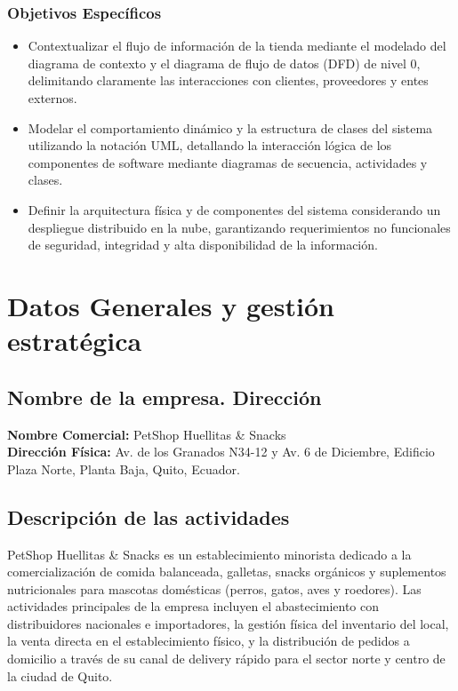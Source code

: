 \documentclass[11pt,a4paper]{article}
\begin{document}
\subsubsection{Objetivos Específicos}
\begin{itemize}
    \item Contextualizar el flujo de información de la tienda mediante el modelado del diagrama de contexto y el diagrama de flujo de datos (DFD) de nivel 0, delimitando claramente las interacciones con clientes, proveedores y entes externos.
    \item Modelar el comportamiento dinámico y la estructura de clases del sistema utilizando la notación UML, detallando la interacción lógica de los componentes de software mediante diagramas de secuencia, actividades y clases.
    \item Definir la arquitectura física y de componentes del sistema considerando un despliegue distribuido en la nube, garantizando requerimientos no funcionales de seguridad, integridad y alta disponibilidad de la información.
\end{itemize}

\newpage
\section{Datos Generales y gestión estratégica}

\subsection{Nombre de la empresa. Dirección}
\textbf{Nombre Comercial:} PetShop Huellitas \& Snacks \\
\textbf{Dirección Física:} Av. de los Granados N34-12 y Av. 6 de Diciembre, Edificio Plaza Norte, Planta Baja, Quito, Ecuador.

\subsection{Descripción de las actividades}
PetShop Huellitas \& Snacks es un establecimiento minorista dedicado a la comercialización de comida balanceada, galletas, snacks orgánicos y suplementos nutricionales para mascotas domésticas (perros, gatos, aves y roedores). Las actividades principales de la empresa incluyen el abastecimiento con distribuidores nacionales e importadores, la gestión física del inventario del local, la venta directa en el establecimiento físico, y la distribución de pedidos a domicilio a través de su canal de delivery rápido para el sector norte y centro de la ciudad de Quito.
\end{document}

